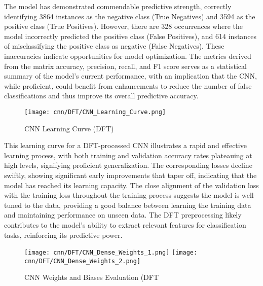 The model has demonstrated commendable predictive strength, correctly identifying 3864 instances as the negative class (True Negatives) and 3594 as the positive class (True Positives). However, there are 328 occurrences where the model incorrectly predicted the positive class (False Positives), and 614 instances of misclassifying the positive class as negative (False Negatives). These inaccuracies indicate opportunities for model optimization. The metrics derived from the matrix accuracy, precision, recall, and F1 score serves as a statistical summary of the model's current performance, with an implication that the CNN, while proficient, could benefit from enhancements to reduce the number of false classifications and thus improve its overall predictive accuracy.

\begin{figure}[H] 
  \centering
  \texttt{[image: cnn/DFT/CNN\_Learning\_Curve.png]}
  \caption{CNN Learning Curve (DFT)}\label{fig:cnn_learning_curve_dft}
\end{figure}

This learning curve for a DFT-processed CNN illustrates a rapid and effective learning process, with both training and validation accuracy rates plateauing at high levels, signifying proficient generalization. The corresponding losses decline swiftly, showing significant early improvements that taper off, indicating that the model has reached its learning capacity. The close alignment of the validation loss with the training loss throughout the training process suggests the model is well-tuned to the data, providing a good balance between learning the training data and maintaining performance on unseen data. The DFT preprocessing likely contributes to the model’s ability to extract relevant features for classification tasks, reinforcing its predictive power.

\begin{figure}[H] 
  \centering
  \texttt{[image: cnn/DFT/CNN\_Dense\_Weights\_1.png]}
  \texttt{[image: cnn/DFT/CNN\_Dense\_Weights\_2.png]}
  \caption{CNN Weights and Biases Evaluation (DFT}\label{fig:cnn_weight_bias_dft}
\end{figure}


